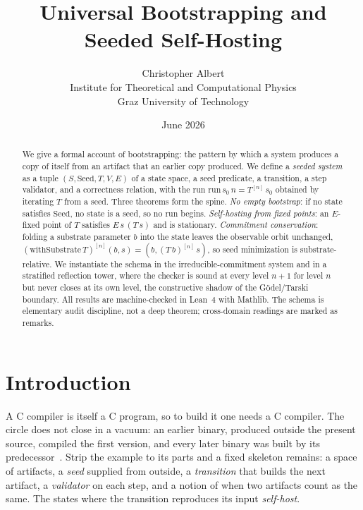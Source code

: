 \documentclass[11pt,a4paper]{article}
\title{Universal Bootstrapping and Seeded Self-Hosting}
\author{Christopher Albert\\
\small Institute for Theoretical and Computational Physics\\
\small Graz University of Technology}
\date{June 2026}
\newcommand{\Seed}{\mathrm{Seed}}
\newcommand{\run}{\mathrm{run}}
\begin{document}
\maketitle

\begin{abstract}
We give a formal account of bootstrapping: the pattern by which a system
produces a copy of itself from an artifact that an earlier copy produced.
We define a \emph{seeded system} as a tuple
$(S, \Seed, T, V, E)$ of a state space, a seed predicate, a transition,
a step validator, and a correctness relation, with the run
$\run\,s_0\,n = T^{[n]}\,s_0$ obtained by iterating $T$ from a seed.
Three theorems form the spine.
\emph{No empty bootstrap}: if no state satisfies $\Seed$, no state is a seed,
so no run begins.
\emph{Self-hosting from fixed points}: an $E$-fixed point of $T$ satisfies
$E\,s\,(T\,s)$ and is stationary.
\emph{Commitment conservation}: folding a substrate parameter $b$ into the
state leaves the observable orbit unchanged,
$(\mathrm{withSubstrate}\,T)^{[n]}(b,s) = (b, (T\,b)^{[n]}\,s)$,
so seed minimization is substrate-relative.
We instantiate the schema in the irreducible-commitment system and in a
stratified reflection tower, where the checker is sound at every level
$n+1$ for level $n$ but never closes at its own level, the constructive
shadow of the G\"odel/Tarski boundary.
All results are machine-checked in Lean~4 with Mathlib.
The schema is elementary audit discipline, not a deep theorem; cross-domain
readings are marked as remarks.
\end{abstract}

\section{Introduction}
\label{sec:intro}

A C compiler is itself a C program, so to build it one needs a C compiler.
The circle does not close in a vacuum: an earlier binary, produced outside the
present source, compiled the first version, and every later binary was built by
its predecessor~\cite{thompson1984}.
Strip the example to its parts and a fixed skeleton remains:
a space of artifacts, a \emph{seed} supplied from outside, a \emph{transition}
that builds the next artifact, a \emph{validator} on each step, and a notion of
when two artifacts count as the same.
The states where the transition reproduces its input \emph{self-host}.
\end{document}
